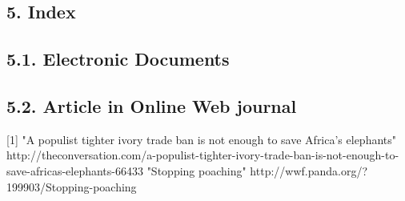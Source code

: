 \documentclass[12pt]{article}
\begin{document}
\subsection*{5. Index}
\subsection *{5.1. Electronic Documents}
\subsection *{5.2. Article in Online Web journal}
[1] "A populist tighter ivory trade ban is not enough to save Africa’s elephants" \newline
 http://theconversation.com/a-populist-tighter-ivory-trade-ban-is-not-enough-to-save-africas-elephants-66433 \newline
[2] "Stopping poaching" \newline
 http://wwf.panda.org/?199903/Stopping-poaching
\end{document}
